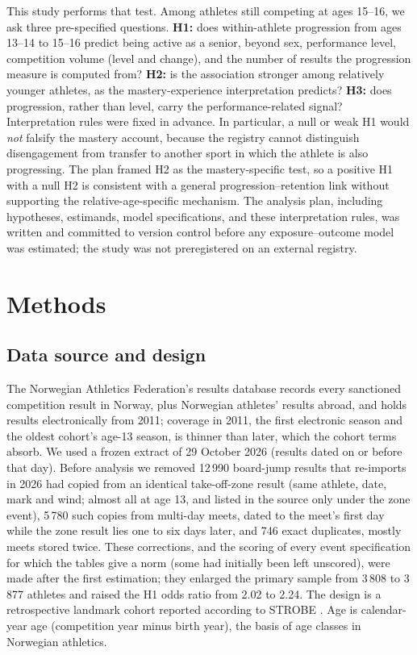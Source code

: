 \documentclass[12pt,a4paper]{article}
\begin{document}
This study performs that test. Among athletes still competing at ages 15--16, we ask three pre-specified questions. \textbf{H1:} does within-athlete progression from ages 13--14 to 15--16 predict being active as a senior, beyond sex, performance level, competition volume (level and change), and the number of results the progression measure is computed from? \textbf{H2:} is the association stronger among relatively younger athletes, as the mastery-experience interpretation predicts? \textbf{H3:} does progression, rather than level, carry the performance-related signal? Interpretation rules were fixed in advance. In particular, a null or weak H1 would \emph{not} falsify the mastery account, because the registry cannot distinguish disengagement from transfer to another sport in which the athlete is also progressing. The plan framed H2 as the mastery-specific test, so a positive H1 with a null H2 is consistent with a general progression--retention link without supporting the relative-age-specific mechanism. The analysis plan, including hypotheses, estimands, model specifications, and these interpretation rules, was written and committed to version control before any exposure--outcome model was estimated; the study was not preregistered on an external registry.

\section{Methods}

\subsection{Data source and design}

The Norwegian Athletics Federation's results database records every sanctioned competition result in Norway, plus Norwegian athletes' results abroad, and holds results electronically from 2011; coverage in 2011, the first electronic season and the oldest cohort's age-13 season, is thinner than later, which the cohort terms absorb. We used a frozen extract of 29 October 2026 (results dated on or before that day). Before analysis we removed 12\,990 board-jump results that re-imports in 2026 had copied from an identical take-off-zone result (same athlete, date, mark and wind; almost all at age 13, and listed in the source only under the zone event), 5\,780 such copies from multi-day meets, dated to the meet's first day while the zone result lies one to six days later, and 746 exact duplicates, mostly meets stored twice. These corrections, and the scoring of every event specification for which the tables give a norm (some had initially been left unscored), were made after the first estimation; they enlarged the primary sample from 3\,808 to 3\,877 athletes and raised the H1 odds ratio from 2.02 to 2.24. The design is a retrospective landmark cohort reported according to STROBE \cite{vonelm2007}. Age is calendar-year age (competition year minus birth year), the basis of age classes in Norwegian athletics.
\end{document}
